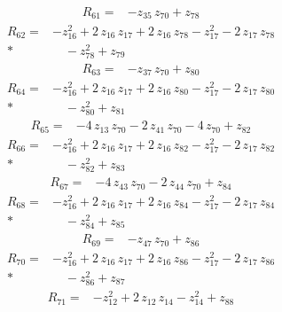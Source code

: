 \documentclass[10pt]{article}
\begin{document}
\begin{align*}
R_{61}={}& - z_{35}\,z_{70} + z_{78}
\end{align*}
\begin{align*}
R_{62}={}& - z_{16}^{2} + 2\,z_{16}\,z_{17} + 2\,z_{16}\,z_{78} - z_{17}^{2} - 2\,z_{17}\,z_{78} \\*
&\quad - z_{78}^{2} + z_{79}
\end{align*}
\begin{align*}
R_{63}={}& - z_{37}\,z_{70} + z_{80}
\end{align*}
\begin{align*}
R_{64}={}& - z_{16}^{2} + 2\,z_{16}\,z_{17} + 2\,z_{16}\,z_{80} - z_{17}^{2} - 2\,z_{17}\,z_{80} \\*
&\quad - z_{80}^{2} + z_{81}
\end{align*}
\begin{align*}
R_{65}={}& - 4\,z_{13}\,z_{70} - 2\,z_{41}\,z_{70} - 4\,z_{70} + z_{82}
\end{align*}
\begin{align*}
R_{66}={}& - z_{16}^{2} + 2\,z_{16}\,z_{17} + 2\,z_{16}\,z_{82} - z_{17}^{2} - 2\,z_{17}\,z_{82} \\*
&\quad - z_{82}^{2} + z_{83}
\end{align*}
\begin{align*}
R_{67}={}& - 4\,z_{43}\,z_{70} - 2\,z_{44}\,z_{70} + z_{84}
\end{align*}
\begin{align*}
R_{68}={}& - z_{16}^{2} + 2\,z_{16}\,z_{17} + 2\,z_{16}\,z_{84} - z_{17}^{2} - 2\,z_{17}\,z_{84} \\*
&\quad - z_{84}^{2} + z_{85}
\end{align*}
\begin{align*}
R_{69}={}& - z_{47}\,z_{70} + z_{86}
\end{align*}
\begin{align*}
R_{70}={}& - z_{16}^{2} + 2\,z_{16}\,z_{17} + 2\,z_{16}\,z_{86} - z_{17}^{2} - 2\,z_{17}\,z_{86} \\*
&\quad - z_{86}^{2} + z_{87}
\end{align*}
\begin{align*}
R_{71}={}& - z_{12}^{2} + 2\,z_{12}\,z_{14} - z_{14}^{2} + z_{88}
\end{align*}
\end{document}
